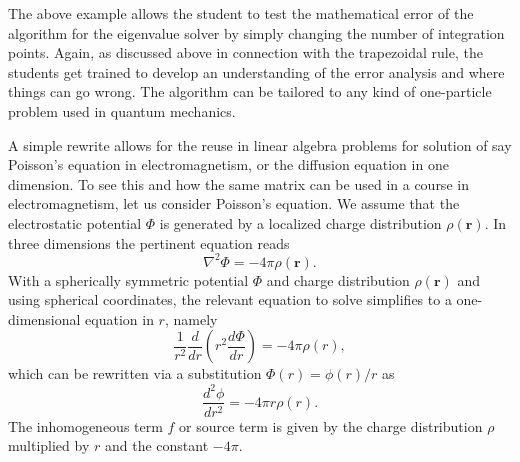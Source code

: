 \documentclass[graybox,envcountchap,sectrefs]{svmult}
\begin{document}
The above example allows the student to test the mathematical error of
the algorithm for the eigenvalue solver by simply changing the number
of integration points. Again, as discussed above in connection with
the trapezoidal rule, the students get trained to develop an
understanding of the error analysis and where things can go wrong. The
algorithm can be tailored to any kind of one-particle problem used in
quantum mechanics.

A simple rewrite allows for the reuse in linear algebra problems for
solution of say Poisson's equation in electromagnetism, or the
diffusion equation in one dimension. To see this and how the same matrix can be used in a course in electromagnetism, let us consider
Poisson's equation.
We assume that
the electrostatic potential $\Phi$ is generated by a localized charge
distribution $\rho (\mathbf{r})$.   In three dimensions
the pertinent equation reads
\[
\nabla^2 \Phi = -4\pi \rho (\mathbf{r}).
\]
With a spherically symmetric potential $\Phi$ and charge distribution $\rho (\mathbf{r})$ and using spherical coordinates,  the relevant
equation to solve
simplifies to a one-dimensional equation in $r$, namely
\[
\frac{1}{r^2}\frac{d}{dr}\left(r^2\frac{d\Phi}{dr}\right) = -4\pi \rho(r),
\]
which can be rewritten via a substitution $\Phi(r)= \phi(r)/r$ as
\[
\frac{d^2\phi}{dr^2}= -4\pi r\rho(r).
\]
The inhomogeneous term $f$ or source term is given by the charge distribution
$\rho$  multiplied by $r$ and the constant $-4\pi$.
\end{document}

